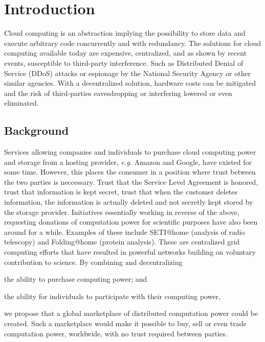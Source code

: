\chapter{Introduction}
Cloud computing is an abstraction implying the possibility to store data and execute arbitrary code concurrently and with redundancy. The solutions for cloud computing available today are expensive, centralized, and as shown by recent events, susceptible to third-party interference. Such as Distributed Denial of Service (DDoS) attacks or espionage by the National Security Agency or other similar agencies. With a decentralized solution, hardware costs can be mitigated and the risk of third-parties eavesdropping or interfering lowered or even eliminated.

\section{Background}
Services allowing companies and individuals to purchase cloud computing power and storage from a hosting provider, \emph{e.g.} Amazon and Google, have existed for some time. However, this places the consumer in a position where trust between the two parties is neccessary. Trust that the Service Level Agreement is honored, trust that information is kept secret, trust that when the customer deletes information, the information is actually deleted and not secretly kept stored by the storage provider. Initiatives essentially working in reverse of the above, requesting donations of computation power for scientific purposes have also been around for a while. Examples of these include SETI@home (analysis of radio telescopy) and Folding@home (protein analysis). These are centralized grid computing efforts that have resulted in powerful networks building on voluntary contribution to science. By combining and decentralizing
\begin{inparaenum}
\item the ability to purchase computing power; and
\item the ability for individuals to participate with their computing power,
\end{inparaenum}
we propose that a global marketplace of distributed computation power could be created. Such a marketplace would make it possible to buy, sell or even trade computation power, worldwide, with no trust required between parties.

